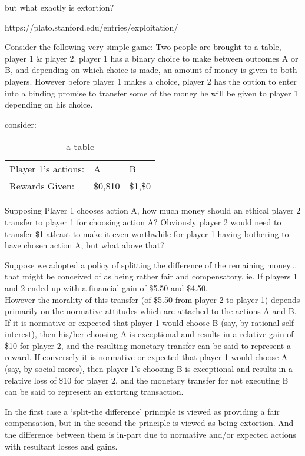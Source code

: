 but what exactly is extortion? 

https://plato.stanford.edu/entries/exploitation/


Consider the following very simple game: Two people are brought to a table, player 1 \& player 2. player 1 has a binary choice to make between outcomes A or B, and depending on which choice is made, an amount of money is given to both players.
However before player 1 makes a choice, player 2 has the option to enter into a binding promise to transfer some of the money he will be given to player 1 depending on his choice.

consider:

\begin{table}[h!]
\begin{tabular}{lll}
Player 1's actions: & A   & B   \\
Rewards Given:      & \$0,\$10 & \$1,\$0
\end{tabular}
\caption{a table}
\end{table}

Supposing Player 1 chooses action A, how much money should an ethical player 2 transfer to player 1 for choosing action A?
Obviously player 2 would need to transfer \$1 atleast to make it even worthwhile for player 1 having bothering to have chosen action A, but what above that?

Suppose we adopted a policy of splitting the difference of the remaining money... that might be conceived of as being rather fair and compensatory. ie. If players 1 and 2 ended up with a financial gain of \$5.50 and \$4.50.\\

However the morality of this transfer (of \$5.50 from player 2 to player 1) depends primarily on the normative attitudes which are attached to the actions A and B.\\

If it is normative or expected that player 1 would choose B (say, by rational self interest), then his/her choosing A is exceptional and results in a relative gain of \$10 for player 2, and the resulting monetary transfer can be said to represent a reward.
If conversely it is normative or expected that player 1 would choose A (say, by social mores), then player 1's choosing B is exceptional and results in a relative loss of \$10 for player 2, and the monetary transfer for not executing B can be said to represent an extorting transaction.

In the first case a `split-the difference' principle is viewed as providing a fair compensation, but in the second the principle is viewed as being extortion.
And the difference between them is in-part due to normative and/or expected actions with resultant losses and gains.

